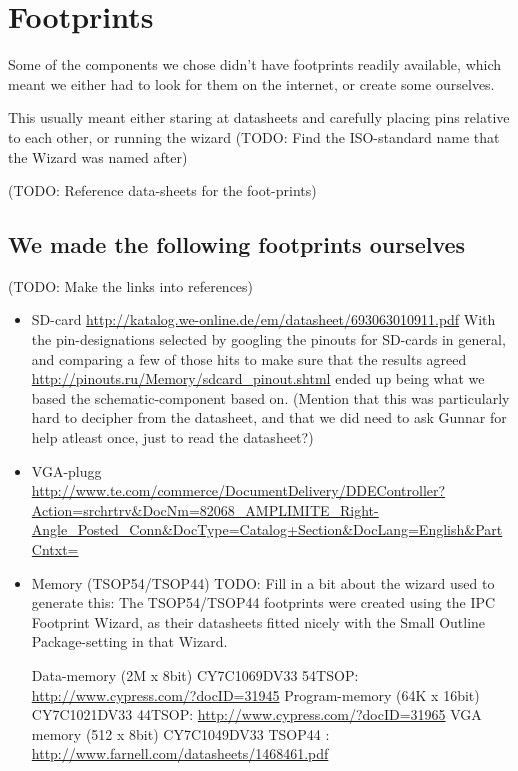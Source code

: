 \section {Footprints}
Some of the components we chose didn't have footprints readily available,
which meant we either had to look for them on the internet, or create some
ourselves.

This usually meant either staring at datasheets and carefully placing pins relative
to each other, or running the wizard (TODO: Find the ISO-standard name that the Wizard was
named after)

(TODO: Reference data-sheets for the foot-prints)

\subsection {We made the following footprints ourselves}
(TODO: Make the links into references)
\begin {itemize}
\item SD-card \url{http://katalog.we-online.de/em/datasheet/693063010911.pdf}
With the pin-designations selected by googling the pinouts for SD-cards in general, and
comparing a few of those hits to make sure that the results agreed \url{http://pinouts.ru/Memory/sdcard_pinout.shtml}
ended up being what we based the schematic-component based on. (Mention that this was
particularly hard to decipher from the datasheet, and that we did need to ask Gunnar for
help atleast once, just to read the datasheet?)
\item VGA-plugg \url{http://www.te.com/commerce/DocumentDelivery/DDEController?Action=srchrtrv&DocNm=82068_AMPLIMITE_Right-Angle_Posted_Conn&DocType=Catalog+Section&DocLang=English&PartCntxt=}
\item Memory (TSOP54/TSOP44)
TODO: Fill in a bit about the wizard used to generate this:
The TSOP54/TSOP44 footprints were created using the IPC Footprint Wizard, as their datasheets fitted
nicely with the Small Outline Package-setting in that Wizard.

Data-memory (2M x 8bit) CY7C1069DV33  54TSOP: \url{http://www.cypress.com/?docID=31945}
Program-memory (64K x 16bit) CY7C1021DV33  44TSOP: \url{http://www.cypress.com/?docID=31965}
VGA memory (512 x 8bit) CY7C1049DV33 TSOP44 : \url{http://www.farnell.com/datasheets/1468461.pdf}
\end {itemize}

